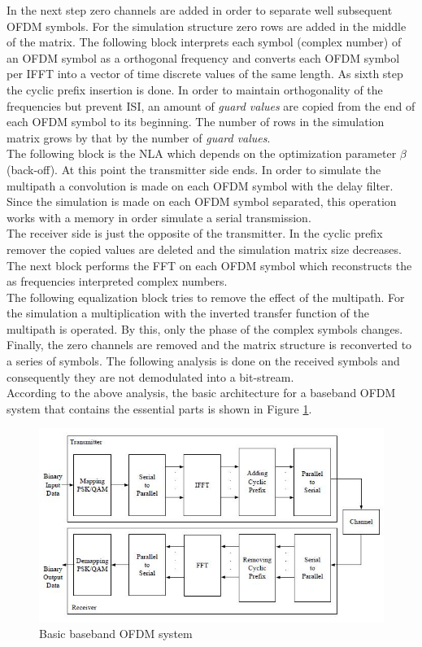 In the next step zero channels are added in order to separate well subsequent OFDM symbols. For the simulation structure zero rows are added in the middle of the matrix. The following block interprets each symbol (complex number) of an OFDM symbol as a orthogonal frequency and converts each OFDM symbol per IFFT into a vector of time discrete values of the same length. As sixth step the cyclic prefix insertion is done. In order to maintain orthogonality of the frequencies but prevent ISI, an amount of \textit{guard values} are copied from the end of each OFDM symbol to its beginning. The number of rows in the simulation matrix grows by that by the number of \textit{guard values}.\\
The following block is the NLA which depends on the optimization parameter $\beta$ (back-off). At this point the transmitter side ends. In order to simulate the multipath a convolution is made on each OFDM symbol with the delay filter. Since the simulation is made on each OFDM symbol separated, this operation works with a memory in order simulate a serial transmission.\\
The receiver side is just the opposite of the transmitter. In the cyclic prefix remover the copied values are deleted and the simulation matrix size decreases. The next block performs the FFT on each OFDM symbol which reconstructs the as frequencies interpreted complex numbers.\\ The following equalization block tries to remove the effect of the multipath. For the simulation a multiplication with the inverted transfer function of the multipath is operated. By this, only the phase of the complex symbols changes.\\ 
Finally, the zero channels are removed and the matrix structure is reconverted to a series of symbols. The following analysis is done on the received symbols and consequently they are not demodulated into a bit-stream.\\
According to the above analysis, the basic architecture for a baseband OFDM system that contains the essential parts is shown in Figure \ref{fig:basic_ofdm}.\\

\begin{figure}[h!]
\centering
\includegraphics[width=12cm]{content/fig/basic_ofdm_design.JPG}
\caption{Basic baseband OFDM system}
\label{fig:basic_ofdm}
\end{figure}


